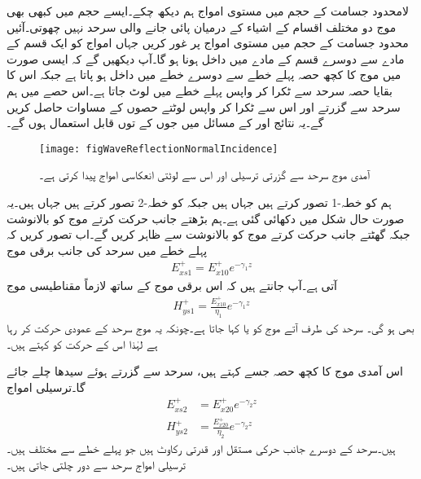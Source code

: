 لامحدود جسامت کے حجم میں مستوی امواج ہم دیکھ چکے۔ایسے حجم میں کبھی بھی موج دو مختلف اقسام کے اشیاء کے درمیان پائی جانے والی سرحد نہیں چھوتی۔آئیں محدود جسامت کے حجم میں مستوی امواج پر غور کریں جہاں امواج کو ایک قسم کے مادے سے دوسرے قسم کے مادے میں داخل ہونا ہو گا۔آپ دیکھیں گے کہ ایسی صورت میں موج کا کچھ حصہ پہلے خطے سے دوسرے خطے میں داخل ہو پاتا ہے جبکہ اس کا بقایا حصہ سرحد سے ٹکرا کر واپس پہلے خطے میں لوٹ جاتا ہے۔اس حصے میں ہم سرحد سے گزرتے اور اس سے ٹکرا کر واپس لوٹتے حصوں کے مساوات حاصل کریں گے۔یہ نتائج   اور   کے مسائل میں جوں کے توں قابل استعمال ہوں گے۔
\begin{figure}
\centering
\texttt{[image: figWaveReflectionNormalIncidence]}
\caption{آمدی موج سرحد سے گزرتی ترسیلی اور اس سے  لوٹتی انعکاسی امواج پیدا کرتی ہے۔}
\label{شکل_موج_آمدی_انعکاسی_ترسیلی}
\end{figure}

ہم  کو خطہ-1 تصور کرتے ہیں جہاں  ہیں جبکہ  کو خطہ-2 تصور کرتے ہیں جہاں  ہیں۔یہ صورت حال شکل  میں دکھائی گئی ہے۔ہم بڑھتے  جانب حرکت کرتے موج کو بالانوشت  جبکہ گھٹتے  جانب حرکت کرتے موج کو بالانوشت  سے ظاہر کریں گے۔اب تصور کریں کہ پہلے خطے میں سرحد کی جانب برقی موج
\begin{align}\label{مساوات_موج_برقی_الف_آمد}
E_{xs1}^+=E_{x10}^+e^{-\gamma_1 z}
\end{align}
آتی ہے۔آپ جانتے ہیں کہ اس برقی موج کے ساتھ لازماً مقناطیسی موج
\begin{align}
H_{ys1}^+=\frac{E_{x10}^+}{\eta_1} e^{-\gamma_1 z}\label{مساوات_موج_مقناطیسی_الف_آمد}
\end{align}
بھی ہو گی۔ سرحد کی طرف آتے موج کو  یا  کہا جاتا ہے۔چونکہ یہ موج سرحد کے عمودی حرکت کر رہا ہے لہٰذا اس کے حرکت کو  کہتے ہیں۔

اس آمدی موج کا کچھ حصہ جسے  کہتے ہیں، سرحد سے گزرتے ہوئے  سیدھا چلے جائے گا۔ترسیلی امواج
\begin{align}
E_{xs2}^+&=E_{x20}^+e^{-\gamma_2 z}\label{مساوات_موج_برقی_ب_ترسیلی}\\
H_{ys2}^+&=\frac{E_{x20}^+}{\eta_2} e^{-\gamma_2 z}\label{مساوات_موج_مقناطیسی_ب_ترسیلی}
\end{align}
ہیں۔سرحد کے دوسرے جانب حرکی مستقل  اور قدرتی رکاوٹ  ہیں جو پہلے خطے سے مختلف ہیں۔ترسیلی امواج سرحد سے دور چلتی جاتی ہیں۔

